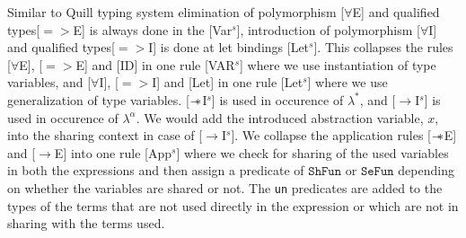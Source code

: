 Similar to Quill typing system \citep{morris_best_2016} elimination of polymorphism [$\forall$E] and qualified
types[$=>$E] is always done in the [Var$^s$], introduction of polymorphism [$\forall$I] and qualified types[$=>$I] is
done at let bindings [Let$^s$]. This collapses the rules [$\forall$E], [$=>$E] and [ID] in one rule [VAR$^s$] where
we use instantiation of type variables, and [$\forall$I], [$=>$I] and [Let] in one rule [Let$^s$] where we use generalization of type variables.
[$\mathrel{-\mkern-6mu*}$I$^s$] is used in occurence of $\lambda^{*}$, and [$\rightarrow$I$^s$] is used in occurence of $\lambda^{\alpha}$.
We would add the introduced abstraction variable, $x$, into the sharing context in case of [$\rightarrow$I$^s$].
We collapse the application rules [$\mathrel{-\mkern-6mu*}$E] and [$\rightarrow$E] into one rule [App$^s$] where we check for sharing of the used variables in both
the expressions and then assign a predicate of $\texttt{ShFun}$ or $\texttt{SeFun}$ depending on whether the variables
are shared or not. The \texttt{un} predicates are added to the types of the terms that are not used directly in the expression
or which are not in sharing with the terms used.

